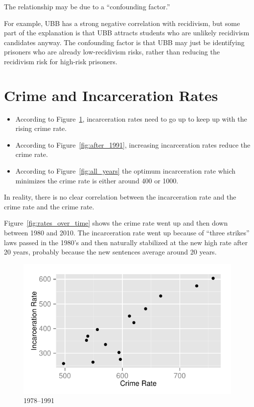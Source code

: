 \documentclass[landscape]{exam}
\begin{document}
  The relationship may be due to a ``confounding factor.''  
  
  For example, UBB has a strong negative correlation with recidivism, but some
  part of the explanation is that UBB attracts students who are unlikely
  recidivism candidates anyway.   The confounding factor is that UBB may just be
  identifying prisoners who are already low-recidivism risks, rather than
  reducing the recidivism risk for high-risk prisoners.

  \section{Crime and Incarceration Rates}

  \begin{itemize}
    \item According to Figure~\ref{fig:before_1991}, incarceration rates need to
      go up to keep up with the rising crime rate.

    \item According to Figure~\ref{fig:after_1991}, increasing incarceration rates 
      reduce the crime rate.

    \item According to Figure~\ref{fig:all_years} the optimum incarceration rate
      which minimizes the crime rate is either around 400 or 1000. 
      
  \end{itemize}

  In reality, there is no clear correlation between the incarceration rate and
  the crime rate and the crime rate.

  Figure~\ref{fig:rates_over_time} shows the crime rate went up and then down
  between 1980 and 2010. The incarceration rate went up because of ``three
  strikes'' laws passed in the 1980's and then naturally stabilized at the new
  high rate after 20 years, probably because the new sentences average around 20
  years.

  \begin{figure}[H]
    \centering
    \includegraphics{figures/crime/crime_vs_incarceration_before_1991.pdf}
    \caption{1978--1991}\label{fig:before_1991}
  \end{figure}
\end{document}
